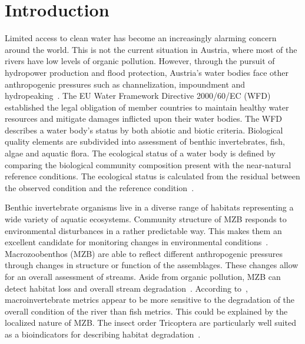 

\section{Introduction}\label{sec:introduction}                                                   %

Limited access to clean water has become an increasingly alarming concern around the world. This is not the current situation in Austria, where most of the rivers have low levels of organic pollution. However, through the pursuit of hydropower production and flood protection, Austria’s water bodies face other anthropogenic pressures such as channelization, impoundment and hydropeaking~. The EU Water Framework Directive 2000/60/EC (WFD) established the legal obligation of member countries to maintain healthy water resources and mitigate damages inflicted upon their water bodies. The WFD describes a water body’s status by both abiotic and biotic criteria. Biological quality elements are subdivided into assessment of benthic invertebrates, fish, algae and aquatic flora. The ecological status of a water body is defined by comparing the biological community composition present with the near-natural reference conditions. The ecological status is calculated from the residual between the observed condition and the reference condition~.

Benthic invertebrate organisms live in a diverse range of habitats representing a wide variety of aquatic ecosystems. Community structure of MZB responds to environmental disturbances in a rather predictable way. This makes them an excellent candidate for monitoring changes in environmental conditions~. Macrozoobenthos (MZB) are able to reflect different anthropogenic pressures through changes in structure or function of the assemblages. These changes allow for an overall assessment of streams. Aside from organic pollution, MZB can detect habitat loss and overall stream degradation~. According to~\textcite{Marzin2012}, macroinvertebrate metrics appear to be more sensitive to the degradation of the overall condition of the river than fish metrics. This could be explained by the localized nature of MZB. The insect order Tricoptera are particularly well suited as a bioindicators for describing habitat degradation~.

